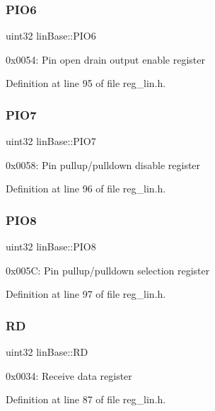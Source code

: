 \subsubsection{\texorpdfstring{P\+I\+O6}{PIO6}}
{\footnotesize\ttfamily uint32 lin\+Base\+::\+P\+I\+O6}

0x0054\+: Pin open drain output enable register 

Definition at line 95 of file reg\+\_\+lin.\+h.

\mbox{\label{structlinBase_a6382de661e22732f2594a28dfd67d9b9}} 
\subsubsection{\texorpdfstring{P\+I\+O7}{PIO7}}
{\footnotesize\ttfamily uint32 lin\+Base\+::\+P\+I\+O7}

0x0058\+: Pin pullup/pulldown disable register 

Definition at line 96 of file reg\+\_\+lin.\+h.

\mbox{\label{structlinBase_a65e59ea5e5e6ae71a20c0a0e9477a468}} 
\subsubsection{\texorpdfstring{P\+I\+O8}{PIO8}}
{\footnotesize\ttfamily uint32 lin\+Base\+::\+P\+I\+O8}

0x005C\+: Pin pullup/pulldown selection register 

Definition at line 97 of file reg\+\_\+lin.\+h.

\mbox{\label{structlinBase_a9620ca11199c24ff55f8af7fd100f1a7}} 
\subsubsection{\texorpdfstring{RD}{RD}}
{\footnotesize\ttfamily uint32 lin\+Base\+::\+RD}

0x0034\+: Receive data register 

Definition at line 87 of file reg\+\_\+lin.\+h.

\mbox{\label{structlinBase_a492e7f1568f7758a2eb655c951ae3535}} 
